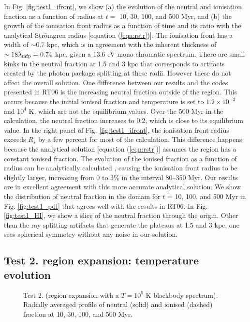 \documentclass[useAMS,usenatbib]{mn2e}
\begin{document}
In Fig. \ref{fig:test1_ifront}, we show (a) the evolution of the
neutral and ionisation fraction as a function of radius at $t = $ 10,
30, 100, and 500 Myr, and (b) the growth of the ionisation front
radius as a function of time and its ratio with the analytical
Str\"{o}mgren radius [equation (\ref{eqn:rstr})].  The ionisation
front has a width of $\sim0.7$ kpc, which is in agreement with the
inherent thickness of $\sim18 \lambda_{\rm mfp} = 0.74$ kpc, given a
13.6 eV mono-chromatic spectrum.  There are small kinks in the neutral
fraction at 1.5 and 3 kpc that corresponds to artifacts created by the
photon package splitting at these radii.  However these do not affect
the overall solution.  One difference between our results and the
codes presented in RT06 is the increasing neutral fraction outside of
the \hii region.  This occurs because the initial ionised fraction and
temperature is set to $1.2 \times 10^{-3}$ and $10^4$ K, which are not
the equilibrium values.  Over the 500 Myr in the calculation, the
neutral fraction increases to 0.2, which is close to its equilibrium
value.  In the right panel of Fig. \ref{fig:test1_ifront}, the
ionisation front radius exceeds $R_s$ by a few percent for most of the
calculation.  This difference happens because the analytical solution
[equation (\ref{eqn:rstr})] assumes the \hii region has a constant
ionised fraction.  The evolution of the ionised fraction as a function
of radius can be analytically calculated \citep[e.g.][]{Osterbrock89,
  Petkova09}, causing the ionisation front radius to be slightly
larger, increasing from 0 to 3\% in the interval 80--350 Myr.  Our
results are in excellent agreement with this more accurate analytical
solution.  We show the distribution of neutral fraction in the domain
for $t$ = 10, 100, and 500 Myr in Fig. \ref{fig:test1_pdf} that agrees
well with the results in RT06.  In Fig. \ref{fig:test1_HI}, we show a
slice of the neutral fraction through the origin.  Other than the ray
splitting artifacts that generate the plateaus at 1.5 and 3 kpc, one
sees spherical symmetry without any noise in our solution.

\subsection{Test 2. \hii region expansion: temperature evolution}

\begin{figure}
  \caption{\label{fig:test2_1a} Test 2. (\hii region expansion with a
    $T=10^5$ K blackbody spectrum).  Radially averaged profile of
    neutral (solid) and ionised (dashed) fraction at 10, 30, 100, and
    500 Myr.}
\end{figure}
\end{document}

